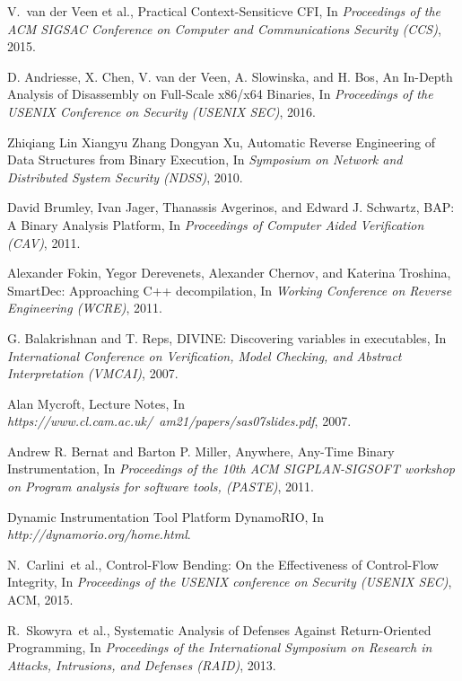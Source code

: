 \documentclass[11pt,a4paper,bibtotoc,idxtotoc,headsepline,footsepline,footexclude,BCOR12mm,DIV13]{scrbook}
\begin{document}
\begin{thebibliography}{50}
V.~van der Veen et al., {Practical Context-Sensiticve CFI}, In
\emph{Proceedings of the ACM SIGSAC Conference on Computer and Communications Security (CCS)}, 2015.

D. Andriesse, X. Chen, V. van der Veen, A. Slowinska, and H. Bos, 
{An In-Depth Analysis of Disassembly on Full-Scale x86/x64 Binaries}, In
\emph{Proceedings of the USENIX Conference on Security (USENIX SEC)}, 2016.

Zhiqiang Lin Xiangyu Zhang Dongyan Xu,
{Automatic Reverse Engineering of Data Structures from Binary Execution}, In
\emph{Symposium on Network and Distributed System Security (NDSS)}, 2010.

David Brumley, Ivan Jager, Thanassis Avgerinos, and Edward J. Schwartz,
{BAP: A Binary Analysis Platform}, 
In \emph{Proceedings of Computer Aided Verification (CAV)}, 2011.

Alexander Fokin, Yegor Derevenets, Alexander Chernov, and Katerina Troshina,
{SmartDec: Approaching C++ decompilation}, 
In \emph{Working Conference on Reverse Engineering (WCRE)}, 2011.

G. Balakrishnan and T. Reps,
{DIVINE: Discovering variables in executables}, 
In \emph{International Conference on Verification, Model Checking, and Abstract Interpretation (VMCAI)}, 2007.

Alan Mycroft,
{Lecture Notes}, 
In \emph{https://www.cl.cam.ac.uk/~am21/papers/sas07slides.pdf}, 2007.

Andrew R. Bernat and Barton P. Miller,
{Anywhere, Any-Time Binary Instrumentation}, 
In \emph{Proceedings of the 10th ACM SIGPLAN-SIGSOFT workshop on Program analysis for software tools, (PASTE)}, 2011.

Dynamic Instrumentation Tool Platform
{DynamoRIO}, 
In \emph{http://dynamorio.org/home.html}.







N.~Carlini~et al., {Control-Flow Bending: On the Effectiveness of Control-Flow Integrity}, In
\emph{Proceedings of the USENIX conference on Security (USENIX SEC)}, ACM, 2015.

R.~Skowyra~et al., {Systematic Analysis of Defenses Against Return-Oriented Programming}, In
\emph{Proceedings of the International Symposium on Research in Attacks, Intrusions, and Defenses (RAID)}, 2013.


\end{thebibliography}
\end{document}
